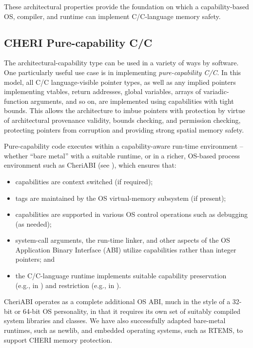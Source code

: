 \documentclass[12pt,twoside,openright,a4paper]{article}
\newcommand{\ccode}[1]{{\small\ttfamily{#1}}}
\newcommand{\cfunc}[1]{{\ccode{#1()}}}
\newcommand{\note}[2]{{\color{blue}[ Note: #1 - #2]}}
\renewcommand{\note}[2]{\relax\ifhmode\unskip\fi}
\newcommand{\psnote}[1]{\note{#1}{Peter S.}}
\newcommand*{\cpp}[1][]{C\textsmaller[2]{\nolinebreak[4]\hspace{-.05em}\raisebox{.45ex}{\textbf{++}}}}
\newcommand*{\cppInHeader}[1][]{\texorpdfstring{\cpp{}}{C++}}
\begin{document}
These architectural properties provide the foundation on which a
capability-based OS, compiler, and runtime can implement C/\cpp{}-language memory
safety.

\psnote{Add:   They have been made precise and have been proved, with machine-checked proof, to hold for the CHERI-MIPS architecture~\cite{cheri-formal-SP2020}.}


\subsection{CHERI Pure-capability C/\cppInHeader{}}

The architectural-capability type can be used in a variety of ways by
software.
One particularly useful use case is in implementing \textit{pure-capability
C/\cpp{}}.
In this model, all C/\cpp{} language-visible pointer types, as well as any
implied pointers implementing vtables, return addresses, global variables,
arrays of variadic-function arguments, and so on, are implemented using
capabilities with tight bounds.
This allows the architecture to imbue pointers with protection by virtue of
architectural provenance validity, bounds checking, and permission checking,
protecting pointers from corruption and providing strong spatial memory
safety.

Pure-capability code executes within a capability-aware run-time environment
-- whether ``bare metal'' with a suitable runtime, or in a richer, OS-based
process environment such as CheriABI (see ),
which ensures that:
\begin{itemize}
  \item capabilities are context switched (if required);
  \item tags are maintained by the OS virtual-memory subsystem (if present);
  \item capabilities are supported in various OS control operations such as
    debugging (as needed);
  \item system-call arguments, the
run-time linker, and other aspects of the OS Application Binary Interface
(ABI) utilize capabilities rather than integer pointers; and
  \item the C/\cpp{}-language runtime implements suitable capability preservation
    \\
    (e.g., in \cfunc{memcpy}) and restriction (e.g., in \cfunc{malloc}).
\end{itemize}
CheriABI operates as a complete additional OS ABI, much in the style of a
32-bit or 64-bit OS personality, in that it requires its own set of suitably
compiled system libraries and classes.
We have also successfully adapted bare-metal runtimes, such as newlib, and
embedded operating systems, such as RTEMS, to support CHERI memory protection.
\end{document}
